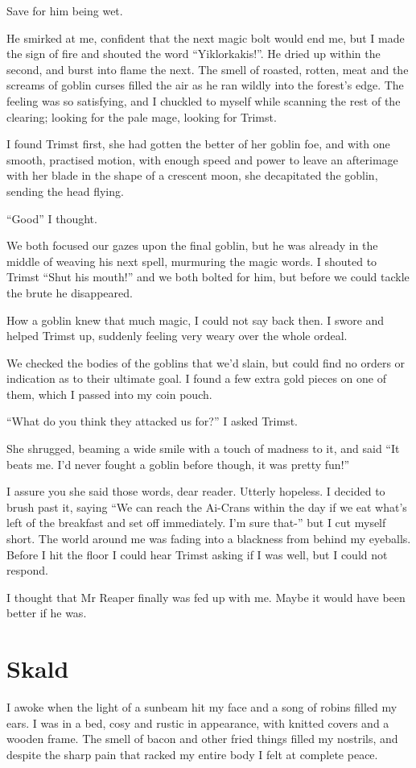\documentclass[12pt, a4paper]{book}
\begin{document}
Save for him being wet. 

He smirked at me, confident that the next magic bolt would end me, but I made the sign of fire and shouted the word ``Yiklorkakis!''. He dried up within the second, and burst into flame the next. The smell of roasted, rotten, meat and the screams of goblin curses filled the air as he ran wildly into the forest's edge. The feeling was so satisfying, and I chuckled to myself while scanning the rest of the clearing; looking for the pale mage, looking for Trimst.

I found Trimst first, she had gotten the better of her goblin foe, and with one smooth, practised motion, with enough speed and power to leave an afterimage with her blade in the shape of a crescent moon, she decapitated the goblin, sending the head flying.

``Good'' I thought.

We both focused our gazes upon the final goblin, but he was already in the middle of weaving his next spell, murmuring the magic words. I shouted to Trimst ``Shut his mouth!'' and we both bolted for him, but before we could tackle the brute he disappeared. 

How a goblin knew that much magic, I could not say back then. I swore and helped Trimst up, suddenly feeling very weary over the whole ordeal.

We checked the bodies of the goblins that we'd slain, but could find no orders or indication as to their ultimate goal. I found a few extra gold pieces on one of them, which I passed into my coin pouch.

``What do you think they attacked us for?'' I asked Trimst.

She shrugged, beaming a wide smile with a touch of madness to it, and said ``It beats me. I'd never fought a goblin before though, it was pretty fun!''

I assure you she said those words, dear reader. Utterly hopeless. I decided to brush past it, saying ``We can reach the Ai-Crans within the day if we eat what's left of the breakfast and set off immediately. I'm sure that-'' but I cut myself short. The world around me was fading into a blackness from behind my eyeballs. Before I hit the floor I could hear Trimst asking if I was well, but I could not respond.

I thought that Mr Reaper finally was fed up with me. Maybe it would have been better if he was.

\chapter{Skald}
I awoke when the light of a sunbeam hit my face and a song of robins filled my ears. I was in a bed, cosy and rustic in appearance, with knitted covers and a wooden frame. The smell of bacon and other fried things filled my nostrils, and despite the sharp pain that racked my entire body I felt at complete peace.
\end{document}
